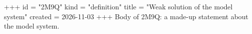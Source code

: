 +++
id = "2M9Q"
kind = "definition"
title = "Weak solution of the model system"
created = 2026-11-03
+++
Body of 2M9Q: a made-up statement about the model system.
